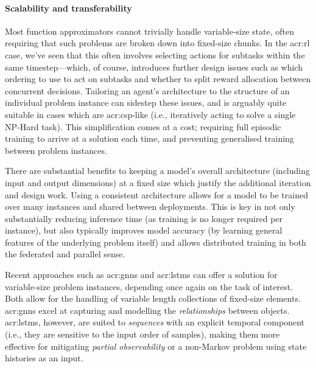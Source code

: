 \paragraph{Scalability and transferability}
Most function approximators cannot trivially handle variable-size state, often requiring that such problems are broken down into fixed-size chunks.
In the \gls{acr:rl} case, we've seen that this often involves selecting actions for subtasks within the same timestep---which, of course, introduces further design issues such as which ordering to use to act on subtasks and whether to split reward allocation between concurrent decisions.
Tailoring an agent's architecture to the structure of an individual problem instance can sidestep these issues, and is arguably quite suitable in cases which are \gls{acr:csp}-like (i.e., iteratively acting to solve a single {\sffamily{}NP}-Hard task).
This simplification comes at a cost; requiring full episodic training to arrive at a solution each time, and preventing generalised training between problem instances.

There are substantial benefits to keeping a model's overall architecture (including input and output dimensions) at a fixed size which justify the additional iteration and design work.
Using a consistent architecture allows for a model to be trained over many instances and shared between deployments.
This is key in not only substantially reducing inference time (as training is no longer required per instance), but also typically improves model accuracy (by learning general features of the underlying problem itself) and allows distributed training in both the federated and parallel sense.

Recent approaches such as \glspl{acr:gnn} and \glspl{acr:lstm} can offer a solution for variable-size problem instances, depending once again on the task of interest.
Both allow for the handling of variable length collections of fixed-size elements.
\glspl{acr:gnn} excel at capturing and modelling the \emph{relationships} between objects.
\glspl{acr:lstm}, however, are suited to \emph{sequences} with an explicit temporal component (i.e., they are sensitive to the input order of samples), making them more effective for mitigating \emph{partial observability} or a non-Markov problem using state histories as an input.


